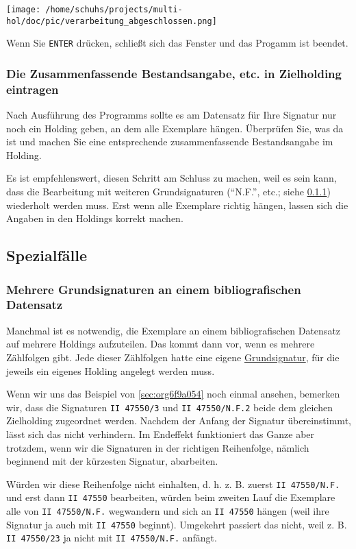\documentclass[10pt, a4paper]{scrartcl}
\begin{document}
\begin{center}
\texttt{[image: /home/schuhs/projects/multi-hol/doc/pic/verarbeitung\_abgeschlossen.png]}
\end{center}

Wenn Sie \texttt{ENTER} drücken, schließt sich das Fenster und das Progamm ist beendet.
\subsubsection{Die Zusammenfassende Bestandsangabe, etc. in Zielholding eintragen}
\label{sec:orga2c8de8}
Nach Ausführung des Programms sollte es am Datensatz für Ihre Signatur nur
noch ein Holding geben, an dem alle Exemplare hängen. Überprüfen Sie, was
da ist und machen Sie eine entsprechende zusammenfassende Bestandsangabe
im Holding.

Es ist empfehlenswert, diesen Schritt am Schluss zu machen, weil es sein
kann, dass die Bearbeitung mit weiteren Grundsignaturen ("`N.F."', etc.;
siehe \ref{sec:orgf0297ec})
wiederholt werden muss. Erst wenn alle Exemplare richtig hängen, lassen
sich die Angaben in den Holdings korrekt machen.
\subsection{Spezialfälle}
\label{sec:org1008a84}
\subsubsection{Mehrere Grundsignaturen an einem bibliografischen Datensatz}
\label{sec:orgf0297ec}
Manchmal ist es notwendig, die Exemplare an einem bibliografischen
Datensatz auf mehrere Holdings aufzuteilen. Das kommt dann vor, wenn es
mehrere Zählfolgen gibt. Jede dieser Zählfolgen hatte eine eigene \hyperref[sec:org9ca78c5]{Grundsignatur}, 
für die jeweils ein eigenes Holding angelegt werden muss.

Wenn wir uns das Beispiel von \ref{sec:org6f9a054} noch einmal ansehen,
bemerken wir, dass die Signaturen \texttt{II 47550/3} und \texttt{II 47550/N.F.2} beide
dem gleichen Zielholding zugeordnet werden. Nachdem der Anfang der
Signatur übereinstimmt, lässt sich das nicht verhindern. Im Endeffekt
funktioniert das Ganze aber trotzdem, wenn wir die Signaturen in der richtigen
Reihenfolge, nämlich beginnend mit der kürzesten Signatur, abarbeiten.

Würden wir diese Reihenfolge nicht einhalten, d. h. z. B. zuerst \texttt{II
      47550/N.F.} und erst dann \texttt{II 47550} bearbeiten, würden beim zweiten Lauf
die Exemplare alle von \texttt{II 47550/N.F.} wegwandern und sich an \texttt{II 47550}
hängen (weil ihre Signatur ja auch mit \texttt{II 47550} beginnt). Umgekehrt
passiert das nicht, weil z. B. \texttt{II 47550/23} ja nicht mit \texttt{II 47550/N.F.}
anfängt.
\end{document}
